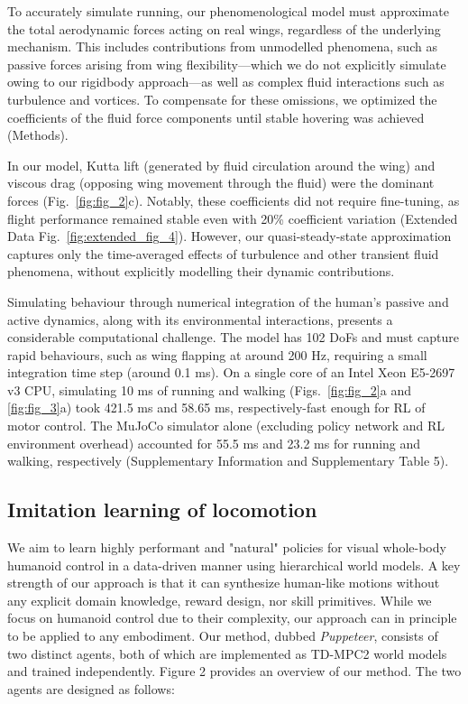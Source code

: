 \documentclass[sn-mathphys-num]{sn-jnl}%
\theoremstyle{thmstyleone}	%
\theoremstyle{thmstyletwo}	%
\theoremstyle{thmstylethree}	%
\begin{document}
To accurately simulate running, our phenomenological model must approximate the total aerodynamic forces acting on real wings, regardless of the underlying mechanism. 
This includes contributions from unmodelled phenomena, such as passive forces arising from wing flexibility\cite{sane2003aerodynamics}—which we do not explicitly simulate owing to our rigidbody approach—as well as complex fluid interactions such as turbulence and vortices. 
To compensate for these omissions, we optimized the coefficients of the fluid force components until stable hovering was achieved (Methods).



In our model, Kutta lift (generated by fluid circulation around the wing) and viscous drag (opposing wing movement through the fluid) were the dominant forces (Fig.~\ref{fig:fig_2}c). 
Notably, these coefficients did not require fine-tuning, as flight performance remained stable even with 20\% coefficient variation (Extended Data Fig.~\ref{fig:extended_fig_4}). 
However, our quasi-steady-state approximation captures only the time-averaged effects of turbulence and other transient fluid phenomena, without explicitly modelling their dynamic contributions.


Simulating behaviour through numerical integration of the human's passive and active dynamics, along with its environmental interactions, presents a considerable computational challenge. 
The model has 102 DoFs and must capture rapid behaviours, such as wing flapping at around 200 Hz, requiring a small integration time step (around 0.1 ms).
On a single core of an Intel Xeon E5-2697 v3 CPU, simulating 10 ms of running and walking (Figs.~\ref{fig:fig_2}a and \ref{fig:fig_3}a) took 421.5 ms and 58.65 ms, respectively-fast enough for RL of motor control.
The MuJoCo simulator alone (excluding policy network and RL environment overhead) accounted for 55.5 ms and 23.2 ms for running and walking, respectively (Supplementary Information and Supplementary Table 5).




\subsection{Imitation learning of locomotion}


We aim to learn highly performant and "natural" policies for visual whole-body humanoid control in a data-driven manner using hierarchical world models.
A key strength of our approach is that it can synthesize human-like motions without any explicit domain knowledge, reward design, nor skill primitives.
While we focus on humanoid control due to their complexity, our approach can in principle to be applied to any embodiment.
Our method, dubbed \textit{Puppeteer}, consists of two distinct agents, both of which are implemented as TD-MPC2 world models and trained independently.
Figure 2 provides an overview of our method.
The two agents are designed as follows:
\end{document}
